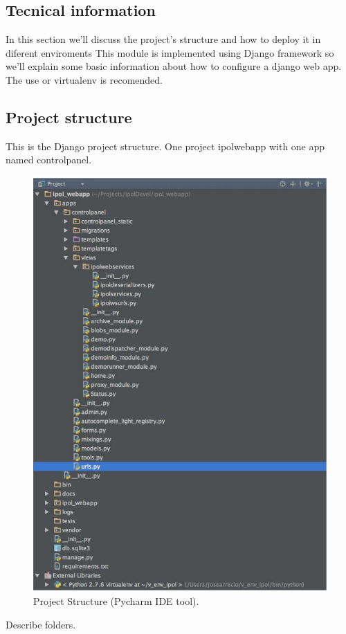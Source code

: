 \subsection{Tecnical information}
In this section we'll discuss the project's structure and how to deploy it in diferent enviroments
This module is implemented using Django framework so we'll explain some basic information about how to configure a django web app.
The use or virtualenv is recomended.

\subsection{Project structure}
This is the Django project structure.
One project ipolwebapp with one app named controlpanel.


\begin{figure}[!ht]
\centering
\includegraphics[width=0.5\columnwidth]{images/ipol_webapp_project.pdf}
\caption{Project Structure (Pycharm IDE tool).} 
\label{fi:project_structure}
\end{figure}
Describe folders.

